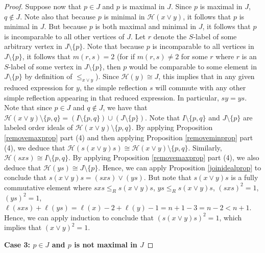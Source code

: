 \documentclass[10pt,a4paper]{amsart}
\def\H#1{\mathcal{H}(#1)}
\def\weakr{\leq_{R}}
\begin{document}
\begin{proof}
    Suppose now that $ p\in J$ and $ p$ is maximal in $J$. Since $p$ is maximal in $J$, $ q\notin J$. Note also that because $ p $ is minimal in $\H{x\vee y}$, it follows that $ p$ is minimal in $J$. But because $p$ is both maximal and minimal in $J$, it follows that $p$ is incomparable to all other vertices of $ J$. Let $ r$ denote the $S$-label of some arbitrary vertex in $ J \setminus \{ p \}$. Note that because $ p$ is incomparable to all vertices in $ J \setminus \{ p \}$, it follows that $ m(r,s) = 2$ (for if $ m(r,s) \neq 2$ for some $ r$ where $r$ is an $S$-label of some vertex in $ J \setminus \{ p \}$, then $ p$ would be comparable to some element in $ J \setminus \{ p \}$ by definition of $ \leq_{x\vee y}$). Since $ \H{y} \cong J$, this implies that in any given reduced expression for $y$, the simple reflection $ s$ will commute with any other simple reflection appearing in that reduced expression. In particular, $ sy=ys$. Note that since $ p\in J$ and $ q\notin J$, we have that $ \H{x\vee y} \setminus \{  p,q \} = (I \setminus \{ p,q \}) \cup (J \setminus \{ p\})$. Note that $I \setminus \{  p,q\} $ and $ J \setminus \{ p\}$ are labeled order ideals of $ \H{x\vee y} \setminus \{  p,q \}$. By applying Proposition \ref{removemaxprop} part (4) and then applying Proposition \ref{removeminprop} part (4), we deduce that $ \H{s(x\vee y)s} \cong \H{x\vee y} \setminus \{ p,q \} $. Similarly, $ \H{sxs} \cong I \setminus \{ p,q \}$. By applying Proposition \ref{removemaxprop} part (4), we also deduce that $ \H{ys} \cong J \setminus \{ p \}$. Hence, we can apply Proposition \ref{joinidealprop} to conclude that $ s(x\vee y)s = (sxs) \vee (ys)$. But note that $ s(x\vee y)s$ is a fully commutative element where $sxs \weakr s(x\vee y)s $, $ ys \weakr s(x\vee y)s$, $ (sxs)^{2}  =1$, $ (ys)^{2} = 1$, $ \ell(sxs)+ \ell(ys) = \ell(x) - 2 + \ell(y) -1 = n+1 -3 = n-2< n+1$. Hence, we can apply induction to conclude that $ (s(x\vee y)s)^{2} = 1$, which implies that $ (x\vee y)^{2} = 1$.

    \textbf{Case 3: $p \in J$ and $ p$ is not maximal in $J$}


\end{proof}
\end{document}
